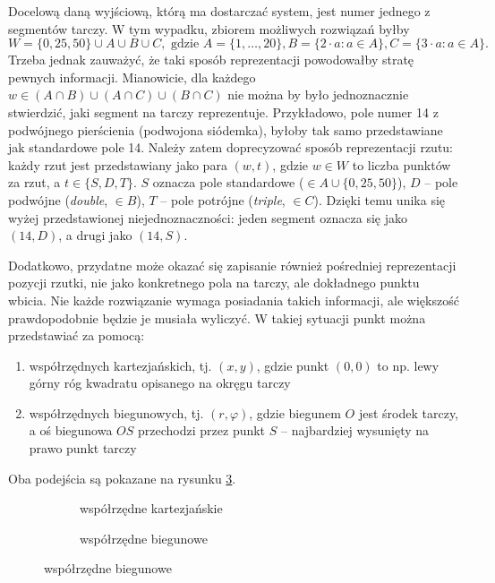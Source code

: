 Docelową daną wyjściową, którą ma dostarczać system, jest numer jednego z segmentów tarczy. W tym wypadku, zbiorem możliwych rozwiązań byłby \[W = \{0, 25, 50\} \cup A \cup B \cup C, \textrm{ gdzie } A = \{1, \ldots, 20 \}, B = \{2 \cdot a : a \in A \}, C = \{3 \cdot a : a \in A \}.\] Trzeba jednak zauważyć, że taki sposób reprezentacji powodowałby stratę pewnych informacji. Mianowicie, dla każdego $w \in (A \cap B) \cup (A \cap C) \cup (B \cap C)$  nie można by było jednoznacznie stwierdzić, jaki segment na tarczy reprezentuje. Przykładowo, pole numer 14 z podwójnego pierścienia (podwojona siódemka), byłoby tak samo przedstawiane jak standardowe pole 14. Należy zatem doprecyzować sposób reprezentacji rzutu: każdy rzut jest przedstawiany jako para $(w, t)$, gdzie $w \in W$ to liczba punktów za rzut, a $t \in \{ S, D, T \}$. $S$ oznacza pole standardowe ($\in A \cup \{0, 25, 50\}$), $D$ -- pole podwójne (\textit{double}, $\in B$), $T$ -- pole potrójne (\textit{triple}, $\in C$). Dzięki temu unika się wyżej przedstawionej niejednoznaczności: jeden segment oznacza się jako $(14, D)$, a drugi jako $(14, S)$.

Dodatkowo, przydatne może okazać się zapisanie również pośredniej reprezentacji pozycji rzutki, nie jako konkretnego pola na tarczy, ale dokładnego punktu wbicia. Nie każde rozwiązanie wymaga posiadania takich informacji, ale większość prawdopodobnie będzie je musiała wyliczyć. W takiej sytuacji punkt można przedstawiać za pomocą:
\begin{enumerate}[label=(\alph*)]
	\item współrzędnych kartezjańskich, tj. $(x, y)$, gdzie punkt $(0, 0)$ to np. lewy górny róg kwadratu opisanego na okręgu tarczy
	\item współrzędnych biegunowych, tj. $(r, \varphi)$, gdzie biegunem $O$ jest środek tarczy, a oś biegunowa $OS$ przechodzi przez punkt $S$ -- najbardziej wysunięty na prawo punkt tarczy 
\end{enumerate}
Oba podejścia są pokazane na rysunku \ref{tarcza_polozenie}.

\begin{figure}[h!]
\centering
\begin{subfigure}{.5\textwidth}
  \centering
  
  \caption{współrzędne kartezjańskie}
  \label{tarcza_kartezjanskie}
\end{subfigure}%
\begin{subfigure}{.5\textwidth}
  \centering
  
  \caption{współrzędne biegunowe}
  \label{tarcza_biegunowe}
\end{subfigure}
\label{tarcza_polozenie}
\end{figure}


